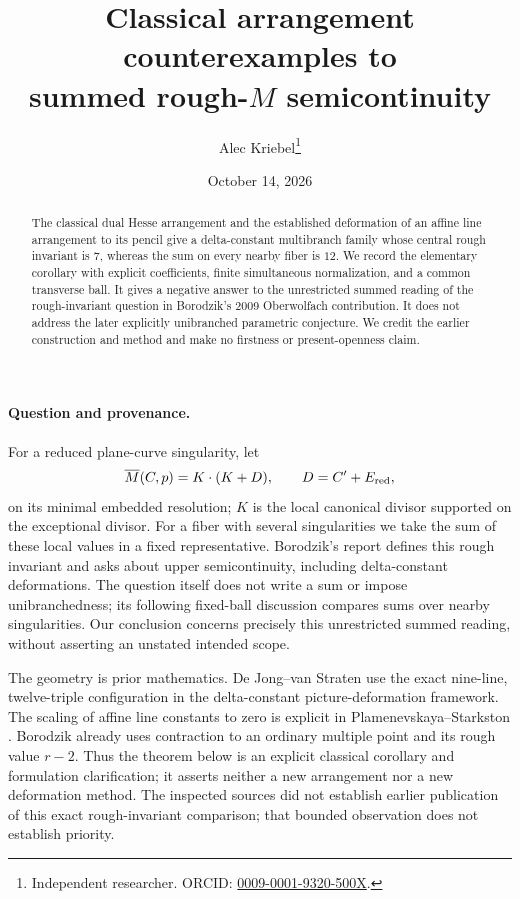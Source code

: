 \documentclass[11pt]{article}
\title{Classical arrangement counterexamples to\protect\\ summed rough-\(M\) semicontinuity}
\author{Alec Kriebel\thanks{Independent researcher. ORCID: \href{https://orcid.org/0009-0001-9320-500X}{0009-0001-9320-500X}.}}
\date{October 14, 2026}
\newcommand{\rough}{\overline M}
\begin{document}
\maketitle
\begin{abstract}
The classical dual Hesse arrangement and the established deformation of an
affine line arrangement to its pencil give a delta-constant multibranch family
whose central rough invariant is \(7\), whereas the sum on every nearby fiber
is \(12\). We record the elementary corollary with explicit coefficients,
finite simultaneous normalization, and a common transverse ball. It gives a
negative answer to the unrestricted summed reading of the rough-invariant
question in Borodzik's 2009 Oberwolfach contribution. It does not address the
later explicitly unibranched parametric conjecture. We credit the earlier
construction and method and make no firstness or present-openness claim.
\end{abstract}

\paragraph{Question and provenance.}
For a reduced plane-curve singularity, let
\[
 \rough(C,p)=K\cdot(K+D),\qquad D=C'+E_{\rm red},
\]
on its minimal embedded resolution; \(K\) is the local canonical divisor
supported on the exceptional divisor. For a fiber with several singularities
we take the sum of these local values in a fixed representative.
Borodzik's report \cite[pp.~2446--2447]{OWR} defines this rough invariant and
asks about upper semicontinuity, including delta-constant deformations.
The question itself does not write a sum or impose unibranchedness; its
following fixed-ball discussion compares sums over nearby singularities.
Our conclusion concerns precisely this unrestricted summed reading, without
asserting an unstated intended scope.

The geometry is prior mathematics. De Jong--van Straten
\cite[Definition~4.2 and Example~6.6]{DvS} use the exact nine-line,
twelve-triple configuration in the delta-constant picture-deformation
framework. The scaling of affine line constants to zero is explicit in
Plamenevskaya--Starkston \cite[Example~8.7]{PS}. Borodzik
\cite[p.~578]{B} already uses contraction to an ordinary multiple point
and its rough value \(r-2\). Thus the theorem below is an explicit classical
corollary and formulation clarification; it asserts neither a new
arrangement nor a new deformation method. The inspected sources did not
establish earlier publication of this exact rough-invariant comparison;
that bounded observation does not establish priority.
\end{document}
